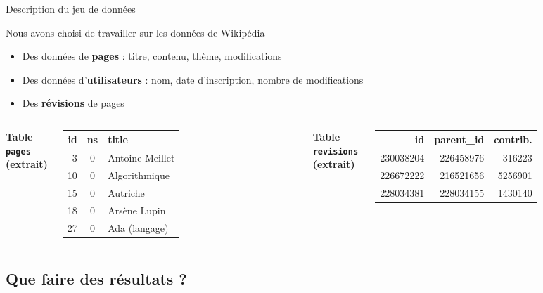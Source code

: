 \documentclass[a4paper,12pt]{beamer}
\begin{document}
\begin{frame}{Description du jeu de données}
    \begin{block}{Nous avons choisi de travailler sur les données de Wikipédia}
        \begin{itemize}
            \item Des données de \textbf{pages} : titre, contenu, thème, modifications
            \item Des données d'\textbf{utilisateurs} : nom, date d'inscription, nombre de modifications
            \item Des \textbf{révisions} de pages
        \end{itemize}
    \end{block}
    \vspace{0.3cm}
    \begin{columns}[T]
        \scriptsize
        \centering
        \textbf{Table \texttt{pages} (extrait)}\\[4pt]
        \begin{tabular}{r c l}
            \textbf{id} & \textbf{ns} & \textbf{title} \\
            \hline
            3  & 0 & Antoine Meillet \\
            10 & 0 & Algorithmique \\
            15 & 0 & Autriche \\
            18 & 0 & Arsène Lupin \\
            27 & 0 & Ada (langage) \\
        \end{tabular}

        \scriptsize
        \centering
        \textbf{Table \texttt{revisions} (extrait)}\\[4pt]
        \begin{tabular}{r r r}
            \textbf{id} & \textbf{parent\_id} & \textbf{contrib.} \\
            \hline
            230038204 & 226458976 & 316223 \\
            226672222 & 216521656 & 5256901 \\
            228034381 & 228034155 & 1430140 \\
        \end{tabular}
    \end{columns}
\end{frame}

\subsection{Que faire des résultats ?}
\end{document}
